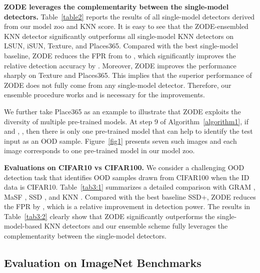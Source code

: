 \documentclass{article} \usepackage{iclr2023_conference,times}
\begin{document}
{\bf ZODE leverages the complementarity between the single-model detectors.} Table~\ref{table2} reports the results of all single-model detectors derived from our model zoo and KNN score. 
It is easy to see that the ZODE-ensembled KNN detector significantly outperforms all single-model KNN detectors on LSUN, iSUN, Texture, and Places365.
Compared with the best single-model baseline, ZODE reduces the FPR from  to , which significantly improves the relative detection accuracy by . 
Moreover, ZODE improves the performance sharply on Texture and Places365. 
This implies that the superior performance of ZODE does not fully come from any single-model detector. Therefore, our ensemble procedure works and is necessary for the improvements.

We further take Place365 as an example to illustrate that ZODE exploits the diversity of multiple pre-trained models.
At step 9 of Algorithm~\ref{algorithm1}, if  and , ,  then there is only one pre-trained model that can help to identify the test input as an OOD sample.
Figure~\ref{fig1} presents seven such images and each image corresponds to one pre-trained model in our model zoo.


{\bf Evaluations on CIFAR10 vs CIFAR100.} We consider a challenging OOD detection task that identifies OOD samples drawn from CIFAR100 when the ID data is CIFAR10.
Table~\ref{tab3:1} summarizes a detailed comparison with GRAM \citep{sastry2019zero}, MaSF \citep{haroush2021statistical}, SSD \citep{sehwag2021ssd}, and KNN \citep{sun2022knn}. 
Compared with the best baseline SSD+, ZODE reduces the FPR by , which is a relative  improvement in detection power. 
The results in Table~\ref{tab3:2} clearly show that ZODE significantly outperforms the single-model-based KNN detectors and our ensemble scheme fully leverages the complementarity between the single-model detectors.




\subsection{Evaluation on ImageNet Benchmarks}
\end{document}
